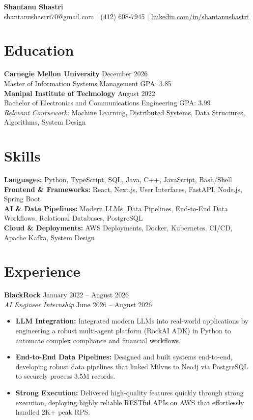 \documentclass[11pt,a4paper]{article}
\begin{document}
\begin{center}
    \Huge \textbf{Shantanu Shastri} \\
    \vspace{2pt}
    \small shantanushastri70@gmail.com $|$ (412) 608-7945 $|$ \href{https://linkedin.com/in/shantanushastri}{linkedin.com/in/shantanushastri}
\end{center}

\vspace{-5pt}
\section{Education}
\noindent
\textbf{Carnegie Mellon University} \hfill December 2026 \\
Master of Information Systems Management \hfill GPA: 3.85 \\
\textbf{Manipal Institute of Technology} \hfill August 2022 \\
Bachelor of Electronics and Communications Engineering \hfill GPA: 3.99 \\
\textit{Relevant Coursework:} Machine Learning, Distributed Systems, Data Structures, Algorithms, System Design

\vspace{-5pt}
\section{Skills}
\noindent
\textbf{Languages:} Python, TypeScript, SQL, Java, C++, JavaScript, Bash/Shell \\
\textbf{Frontend \& Frameworks:} React, Next.js, User Interfaces, FastAPI, Node.js, Spring Boot \\
\textbf{AI \& Data Pipelines:} Modern LLMs, Data Pipelines, End-to-End Data Workflows, Relational Databases, PostgreSQL \\
\textbf{Cloud \& Deployments:} AWS Deployments, Docker, Kubernetes, CI/CD, Apache Kafka, System Design

\vspace{-5pt}
\section{Experience}
\noindent
\textbf{BlackRock} \hfill January 2022 -- August 2026 \\
\textit{AI Engineer Internship} \hfill June 2026 -- August 2026
\begin{itemize}[leftmargin=*,noitemsep,topsep=0pt]
    \item \textbf{LLM Integration:} Integrated modern LLMs into real-world applications by engineering a robust multi-agent platform (RockAI ADK) in Python to automate complex compliance and financial workflows.
    \item \textbf{End-to-End Data Pipelines:} Designed and built systems end-to-end, developing robust data pipelines that linked Milvus to Neo4j via PostgreSQL to securely process 3.5M records.
    \item \textbf{Strong Execution:} Delivered high-quality features quickly through strong execution, deploying highly reliable RESTful APIs on AWS that effortlessly handled 2K+ peak RPS.
\end{itemize}
\end{document}

